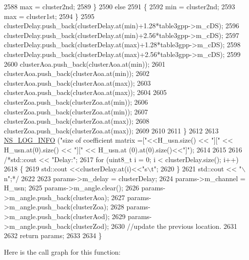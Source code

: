\begin{DoxyCode}
2588                         max = cluster2nd;
2589                 \}
2590                 \textcolor{keywordflow}{else}
2591                 \{
2592                         min = cluster2nd;
2593                         max = cluster1st;
2594                 \}
2595                 clusterDelay.push\_back(clusterDelay.at(min)+1.28*table3gpp->m\_cDS);
2596                 clusterDelay.push\_back(clusterDelay.at(min)+2.56*table3gpp->m\_cDS);
2597                 clusterDelay.push\_back(clusterDelay.at(max)+1.28*table3gpp->m\_cDS);
2598                 clusterDelay.push\_back(clusterDelay.at(max)+2.56*table3gpp->m\_cDS);
2599 
2600                 clusterAoa.push\_back(clusterAoa.at(min));
2601                 clusterAoa.push\_back(clusterAoa.at(min));
2602                 clusterAoa.push\_back(clusterAoa.at(max));
2603                 clusterAoa.push\_back(clusterAoa.at(max));
2604 
2605                 clusterZoa.push\_back(clusterZoa.at(min));
2606                 clusterZoa.push\_back(clusterZoa.at(min));
2607                 clusterZoa.push\_back(clusterZoa.at(max));
2608                 clusterZoa.push\_back(clusterZoa.at(max));
2609 
2610 
2611         \}
2612 
2613         \hyperlink{group__logging_gafbd73ee2cf9f26b319f49086d8e860fb}{NS\_LOG\_INFO} (\textcolor{stringliteral}{"size of coefficient matrix =["}<<H\_usn.size() << \textcolor{stringliteral}{"]["} << H\_usn.at(0).size()
       << \textcolor{stringliteral}{"]["} << H\_usn.at (0).at(0).size()<<\textcolor{stringliteral}{"]"});
2614 
2615 
2616         \textcolor{comment}{/*std::cout << "Delay:";}
2617 \textcolor{comment}{        for (uint8\_t i = 0; i < clusterDelay.size(); i++)}
2618 \textcolor{comment}{        \{}
2619 \textcolor{comment}{                std::cout <<clusterDelay.at(i)<<"s\(\backslash\)t";}
2620 \textcolor{comment}{        \}}
2621 \textcolor{comment}{        std::cout << "\(\backslash\)n";*/}
2622 
2623         params->m\_delay = clusterDelay;
2624         params->m\_channel = H\_usn;
2625         params->m\_angle.clear();
2626         params->m\_angle.push\_back(clusterAoa);
2627         params->m\_angle.push\_back(clusterZoa);
2628         params->m\_angle.push\_back(clusterAod);
2629         params->m\_angle.push\_back(clusterZod);
2630         \textcolor{comment}{//update the previous location.}
2631 
2632         \textcolor{keywordflow}{return} params;
2633 
2634 \}
\end{DoxyCode}


Here is the call graph for this function\+:




